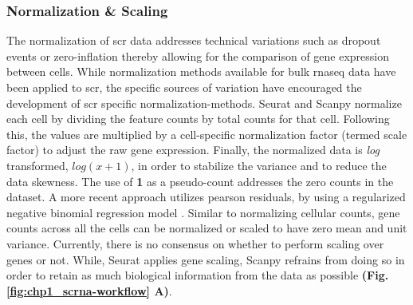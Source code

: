 \subsubsection{Normalization \& Scaling}


\par The normalization of \gls{scr} data addresses technical variations such as dropout events or zero-inflation thereby allowing for the comparison of gene expression between cells. While normalization methods available for bulk \gls{rnaseq} data have been applied to \gls{scr}, the specific sources of variation have encouraged the development of \gls{scr} specific normalization-methods. Seurat \textbf{\cite{butler_integrating_2018,stuart_comprehensive_2019,hao_integrated_2021}} and Scanpy \textbf{\cite{wolf_scanpy_2018}} normalize each cell by dividing the feature counts by total counts for that cell. Following this, the values are multiplied by a cell-specific normalization factor (termed scale factor) to adjust the raw gene expression. Finally, the normalized data is \textit{log} transformed, \begin{math}log(x+1)\end{math}, in order to stabilize the variance and to reduce the data skewness. The use of \textbf{1} as a pseudo-count addresses the zero counts in the dataset. A more recent approach utilizes pearson residuals, by using a regularized negative binomial regression model \textbf{\cite{hafemeister_normalization_2019}}. Similar to normalizing cellular counts, gene counts across all the cells can be normalized or scaled to have zero mean and unit variance. Currently, there is no consensus on whether to perform scaling over genes or not. While, Seurat \textbf{\cite{stuart_comprehensive_2019,hao_integrated_2021}} applies gene scaling, Scanpy \textbf{\cite{wolf_scanpy_2018}} refrains from doing so in order to retain as much biological information from the data as possible \textbf{(Fig. \ref{fig:chp1_scrna-workflow} A)}.

